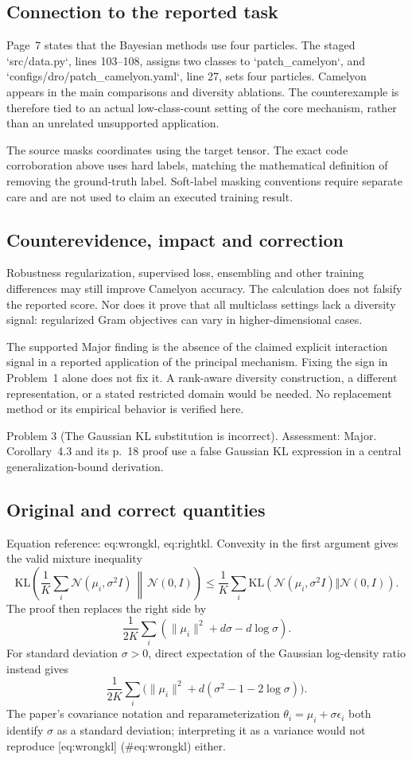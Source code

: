 \documentclass[10pt]{article}
\begin{document}
\subsection*{Connection to the reported task}
Page 7 states that the Bayesian methods use four particles. The staged `src/data.py`, lines 103–108, assigns two classes to `patch\_camelyon`, and `configs/dro/patch\_camelyon.yaml`, line 27, sets four particles. Camelyon appears in the main comparisons and diversity ablations. The counterexample is therefore tied to an actual low-class-count setting of the core mechanism, rather than an unrelated unsupported application.\par
The source masks coordinates using the target tensor. The exact code corroboration above uses hard labels, matching the mathematical definition of removing the ground-truth label. Soft-label masking conventions require separate care and are not used to claim an executed training result.\par
\subsection*{Counterevidence, impact and correction}
Robustness regularization, supervised loss, ensembling and other training differences may still improve Camelyon accuracy. The calculation does not falsify the reported score. Nor does it prove that all multiclass settings lack a diversity signal: regularized Gram objectives can vary in higher-dimensional cases.\par
The supported Major finding is the absence of the claimed explicit interaction signal in a reported application of the principal mechanism. Fixing the sign in Problem 1 alone does not fix it. A rank-aware diversity construction, a different representation, or a stated restricted domain would be needed. No replacement method or its empirical behavior is verified here.\par
Problem 3 (The Gaussian KL substitution is incorrect).  Assessment: Major. Corollary 4.3 and its p. 18 proof use a false Gaussian KL expression in a central generalization-bound derivation.\par
\subsection*{Original and correct quantities}
Equation reference: eq:wrongkl, eq:rightkl. Convexity in the first argument gives the valid mixture inequality \[\mathrm{KL}\left(\frac1K\sum_i\mathcal N(\mu_i,\sigma^2I)
       \,\middle\Vert\,\mathcal N(0,I)\right)
 \le\frac1K\sum_i
   \mathrm{KL}(\mathcal N(\mu_i,\sigma^2I)\Vert\mathcal N(0,I)).\] The proof then replaces the right side by \[
 \frac1{2K}\sum_i(\|\mu_i\|^2+d\sigma-d\log\sigma).\] For standard deviation \(\sigma>0\), direct expectation of the Gaussian log-density ratio instead gives \[
 \frac1{2K}\sum_i
 \bigl(\|\mu_i\|^2+d(\sigma^2-1-2\log\sigma)\bigr).\] The paper’s covariance notation and reparameterization \(\theta_i=\mu_i+\sigma\epsilon_i\) both identify \(\sigma\) as a standard deviation; interpreting it as a variance would not reproduce [eq:wrongkl] (\#eq:wrongkl) either.\par
\end{document}
